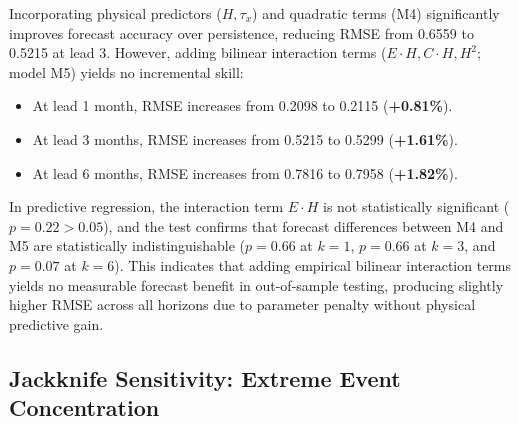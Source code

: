 \documentclass[11pt,a4paper]{article}
\begin{document}
Incorporating physical predictors ($H, \tau_x$) and quadratic terms (M4) significantly improves forecast accuracy over persistence, reducing RMSE from 0.6559 to 0.5215 at lead 3. However, adding bilinear interaction terms ($E \cdot H, C \cdot H, H^2$; model M5) yields no incremental skill:
\begin{itemize}
    \item At lead 1 month, RMSE increases from 0.2098 to 0.2115 (\textbf{+0.81\%}).
    \item At lead 3 months, RMSE increases from 0.5215 to 0.5299 (\textbf{+1.61\%}).
    \item At lead 6 months, RMSE increases from 0.7816 to 0.7958 (\textbf{+1.82\%}).
\end{itemize}
In predictive regression, the interaction term $E \cdot H$ is not statistically significant ($p = 0.22 > 0.05$), and the \citet{diebold1995comparing} test confirms that forecast differences between M4 and M5 are statistically indistinguishable ($p = 0.66$ at $k=1$, $p = 0.66$ at $k=3$, and $p = 0.07$ at $k=6$). This indicates that adding empirical bilinear interaction terms yields no measurable forecast benefit in out-of-sample testing, producing slightly higher RMSE across all horizons due to parameter penalty without physical predictive gain.

\subsection{Jackknife Sensitivity: Extreme Event Concentration}

\begin{table}[!htbp]
\centering
\small
\caption{Jackknife sensitivity analysis of $\mathcal{T}^{(3)}$ to super El Ni\~no events ($N=466$, 1980--2018). Case 1 retains fixed global standardization ($\sigma$ from $N=466$) to measure extreme tail contributions directly. In Case 2 (subsamples re-standardized to unit variance), excluding all three super events yields $T_{EEE} = +0.4159$, $T_{EEH} = +0.1063$, $T_{ECH} = +0.2383$, and $\|\mathcal{T}^{(3)}\|_F = 1.3356$ ($-58.3\%$).}
\label{tab:jackknife}
\end{table}
\end{document}
